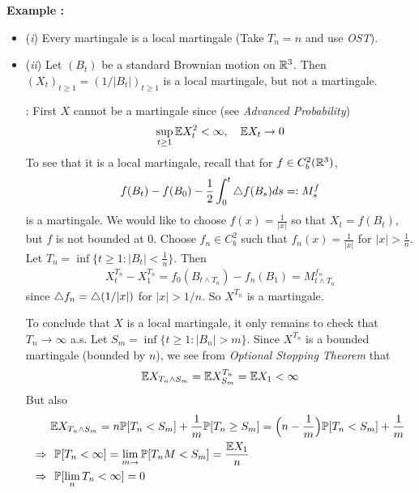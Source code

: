 \documentclass[12pt,a4paper]{article}
\newenvironment{subproof}
{\begin{changemargin}{0.5cm}{0.5cm} 
	}%
	{\end{changemargin}
}
\renewenvironment{i}
{\begin{itemize} 
	}%
	{\end{itemize}
}
\begin{document}
\textbf{Example :} 
\begin{i}
\item[(\textit{i})] Every martingale is a local martingale (Take $T_n = n$ and use \emph{OST}).
\item[(\textit{ii})] Let $(B_t)$ be a standard Brownian motion on $\mathbb{R}^3$. Then $(X_t)_{t\geq 1} = (1/|B_t|)_{t\geq 1}$ is a local martingale, but not a martingale.
\begin{subproof}
: First $X$ cannot be a martingale since (see \emph{Advanced Probability})
\begin{align*}
\sup_{t\geq 1} \mathbb{E} X_t^2 < \infty, \quad \mathbb{E} X_t \rightarrow 0
\end{align*}
To see that it is a local martingale, recall that for $f\in C_b^2(\mathbb{R}^3)$,
\begin{align*}
f(B_t) - f(B_0) - \frac{1}{2}\int_0^t \triangle f(B_s) ds =: M_s^f
\end{align*}
is a martingale. We would like to choose $f(x) = \frac{1}{|x|}$ so that $X_t = f(B_t)$, but $f$ is not bounded at 0. Choose $f_n \in C_b^2$ such that $f_n(x) =\frac{1}{|x|}$ for $|x|> \frac{1}{n}$. Let $T_n = \inf \{ t\geq 1: |B_t | < \frac{1}{n}\}$. Then
\begin{align*}
X_t^{T_n} - X_1^{T_n} = f_0(B_{t\wedge T_n}) - f_n(B_1) = M_{t\wedge T_n}^{f_n}
\end{align*}
since $\triangle f_n = \triangle (1/ |x|)$ for $|x| > 1/n$. So $X^{T_n}$ is a martingale.

\quad To conclude that $X$ is a local martingale, it only remains to check that $T_n\rightarrow \infty$ a.s. Let $S_m = \inf \{ t\geq 1 : |B_n| >m\}$. Since $X^{T_n}$ is a bounded martingale (bounded by $n$), we see from \emph{Optional Stopping Theorem} that
\begin{align*}
\mathbb{E} X_{T_n \wedge S_m} = \mathbb{E} X_{S_m}^{T_n} = \mathbb{E} X_1 < \infty
\end{align*}
But also
\begin{align*}
& \mathbb{E} X_{T_n \wedge S_m} = n \mathbb{P} [T_n < S_m ] + \frac{1}{m} \mathbb{P}[T_n \geq S_m] = \Big(n - \frac{1}{m} \Big) \mathbb{P} [T_n <S_m] + \frac{1}{m} \\
\Rightarrow  \,\, &  \,\, \mathbb{P} [T_n < \infty] = \lim_{m\rightarrow } \mathbb{P} [T_n M < S_m] = \frac{\mathbb{E} X_1}{n} \\
\Rightarrow  \,\, &  \,\,  \mathbb{P} [\lim_n T_n < \infty] =0
\end{align*}
\end{subproof}
\end{i}
\s
\end{document}
